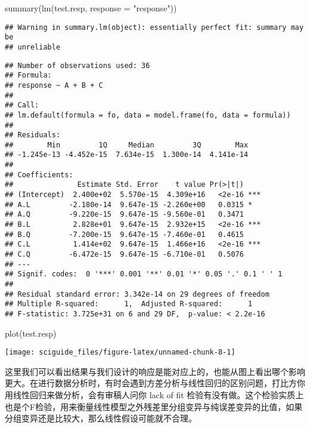 \documentclass[]{tufte-book}
\newenvironment{Shaded}{}{}
\newcommand{\AttributeTok}[1]{\textcolor[rgb]{0.49,0.56,0.16}{#1}}
\newcommand{\FunctionTok}[1]{\textcolor[rgb]{0.02,0.16,0.49}{#1}}
\newcommand{\NormalTok}[1]{#1}
\newcommand{\StringTok}[1]{\textcolor[rgb]{0.25,0.44,0.63}{#1}}
\begin{document}
\begin{Shaded}
\begin{Highlighting}[]
\FunctionTok{summary}\NormalTok{(}\FunctionTok{lm}\NormalTok{(test.resp, }\AttributeTok{response =} \StringTok{"response"}\NormalTok{))}
\end{Highlighting}
\end{Shaded}

\begin{verbatim}
## Warning in summary.lm(object): essentially perfect fit: summary may be
## unreliable
\end{verbatim}

\begin{verbatim}
## Number of observations used: 36 
## Formula:
## response ~ A + B + C
## 
## Call:
## lm.default(formula = fo, data = model.frame(fo, data = formula))
## 
## Residuals:
##        Min         1Q     Median         3Q        Max 
## -1.245e-13 -4.452e-15  7.634e-15  1.300e-14  4.141e-14 
## 
## Coefficients:
##               Estimate Std. Error    t value Pr(>|t|)    
## (Intercept)  2.400e+02  5.570e-15  4.309e+16   <2e-16 ***
## A.L         -2.180e-14  9.647e-15 -2.260e+00   0.0315 *  
## A.Q         -9.220e-15  9.647e-15 -9.560e-01   0.3471    
## B.L          2.828e+01  9.647e-15  2.932e+15   <2e-16 ***
## B.Q         -7.200e-15  9.647e-15 -7.460e-01   0.4615    
## C.L          1.414e+02  9.647e-15  1.466e+16   <2e-16 ***
## C.Q         -6.472e-15  9.647e-15 -6.710e-01   0.5076    
## ---
## Signif. codes:  0 '***' 0.001 '**' 0.01 '*' 0.05 '.' 0.1 ' ' 1
## 
## Residual standard error: 3.342e-14 on 29 degrees of freedom
## Multiple R-squared:      1,  Adjusted R-squared:      1 
## F-statistic: 3.725e+31 on 6 and 29 DF,  p-value: < 2.2e-16
\end{verbatim}

\begin{Shaded}
\begin{Highlighting}[]
\FunctionTok{plot}\NormalTok{(test.resp)}
\end{Highlighting}
\end{Shaded}

\texttt{[image: sciguide\_files/figure-latex/unnamed-chunk-8-1]}

这里我们可以看出结果与我们设计的响应是能对应上的，也能从图上看出哪个影响更大。在进行数据分析时，有时会遇到方差分析与线性回归的区别问题，打比方你用线性回归来做分析，会有审稿人问你 lack of fit 检验有没有做。这个检验实质上也是个F检验，用来衡量线性模型之外残差里分组变异与纯误差变异的比值，如果分组变异还是比较大，那么线性假设可能就不合理。
\end{document}
